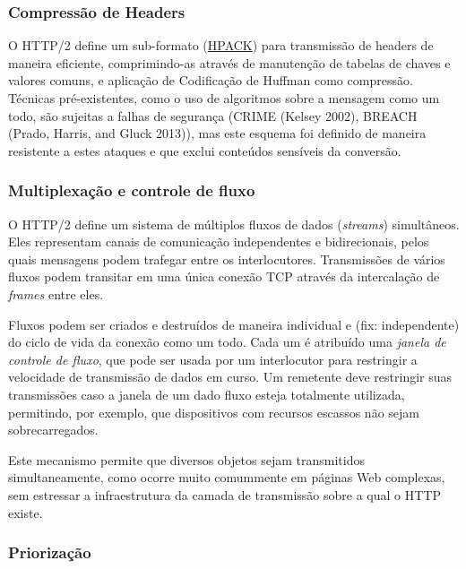 \documentclass[12pt,a4paper,openright,twoside,english,brazil,]{abntex2}	%
\begin{document}
\subsubsection{Compressão de Headers}\label{compressuxe3o-de-headers}

O HTTP/2 define um sub-formato
(\href{https://http2.github.io/http2-spec/compression.html}{HPACK}) para
transmissão de headers de maneira eficiente, comprimindo-as através de
manutenção de tabelas de chaves e valores comuns, e aplicação de
Codificação de Huffman como compressão. Técnicas pré-existentes, como o
uso de algoritmos sobre a mensagem como um todo, são sujeitas a falhas
de segurança (CRIME (Kelsey 2002), BREACH (Prado, Harris, and Gluck
2013)), mas este esquema foi definido de maneira resistente a estes
ataques e que exclui conteúdos sensíveis da conversão.

\subsubsection{Multiplexação e controle de
fluxo}\label{multiplexauxe7uxe3o-e-controle-de-fluxo}

O HTTP/2 define um sistema de múltiplos fluxos de dados (\emph{streams})
simultâneos. Eles representam canais de comunicação independentes e
bidirecionais, pelos quais mensagens podem trafegar entre os
interlocutores. Transmissões de vários fluxos podem transitar em uma
única conexão TCP através da intercalação de \emph{frames} entre eles.

Fluxos podem ser criados e destruídos de maneira individual e (fix:
independente) do ciclo de vida da conexão como um todo. Cada um é
atribuído uma \emph{janela de controle de fluxo}, que pode ser usada por
um interlocutor para restringir a velocidade de transmissão de dados em
curso. Um remetente deve restringir suas transmissões caso a janela de
um dado fluxo esteja totalmente utilizada, permitindo, por exemplo, que
dispositivos com recursos escassos não sejam sobrecarregados.

Este mecanismo permite que diversos objetos sejam transmitidos
simultaneamente, como ocorre muito comummente em páginas Web complexas,
sem estressar a infraestrutura da camada de transmissão sobre a qual o
HTTP existe.

\subsubsection{Priorização}\label{priorizauxe7uxe3o}
\end{document}
